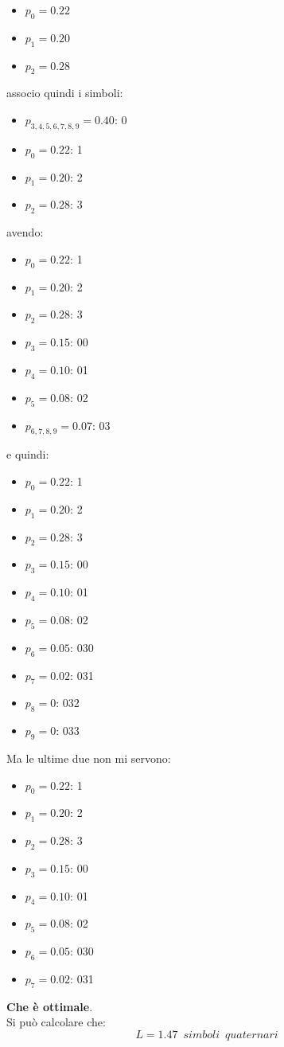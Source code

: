 \documentclass[a4paper,12pt, oneside]{book}
\begin{document}
\begin{esempio}
\begin{itemize}
    \item $p_0=0.22$
    \item $p_1=0.20$
    \item $p_2=0.28$
  \end{itemize}
  associo quindi i simboli:
   \begin{itemize}
    \item $p_{3,4,5,6,7,8,9}=0.40$: 0
    \item $p_0=0.22$: 1
    \item $p_1=0.20$: 2
    \item $p_2=0.28$: 3
  \end{itemize}
  avendo:
  \begin{itemize}
    \item $p_0=0.22$: 1
    \item $p_1=0.20$: 2
    \item $p_2=0.28$: 3
    \item $p_3=0.15$: 00
    \item $p_4=0.10$: 01
    \item $p_5=0.08$: 02
    \item $p_{6,7,8,9}=0.07$: 03
  \end{itemize}
  e quindi:
  \begin{itemize}
    \item $p_0=0.22$: 1
    \item $p_1=0.20$: 2 
    \item $p_2=0.28$: 3
    \item $p_3=0.15$: 00
    \item $p_4=0.10$: 01
    \item $p_5=0.08$: 02
    \item $p_6=0.05$: 030
    \item $p_7=0.02$: 031
    \item $p_8=0$: 032
    \item $p_9=0$: 033
  \end{itemize}
  Ma le ultime due non mi servono:
  \begin{itemize}
    \item $p_0=0.22$: 1
    \item $p_1=0.20$: 2 
    \item $p_2=0.28$: 3
    \item $p_3=0.15$: 00
    \item $p_4=0.10$: 01
    \item $p_5=0.08$: 02
    \item $p_6=0.05$: 030
    \item $p_7=0.02$: 031
  \end{itemize}
  \textbf{Che è ottimale}.\\
  Si può calcolare che:
  \[L=1.47\,\,\,simboli\,\,\, quaternari\]
\end{esempio}
\end{document}
